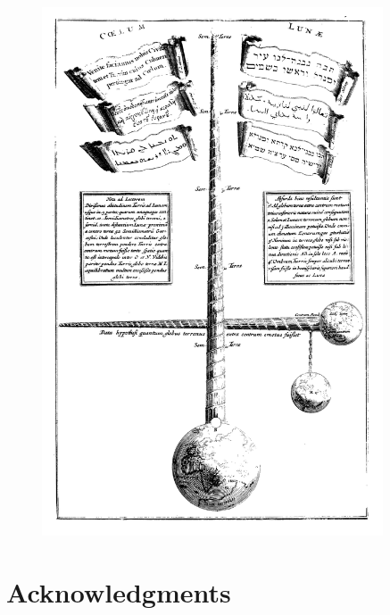 \begin{figure}
\includegraphics[width=0.9\textwidth]{intro/figures/turris_babel.jpg}
\caption{}
\label{fig:turris_babel}
\end{figure}


\section*{Acknowledgments}
